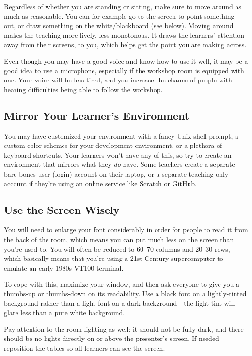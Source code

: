 Regardless of whether you are standing or sitting, make sure to move
around as much as reasonable. You can for example go to the screen to
point something out, or draw something on the white/blackboard (see
below). Moving around makes the teaching more lively, less monotonous.
It draws the learners' attention away from their screens, to you,
which helps get the point you are making across.

Even though you may have a good voice and know how to use it well, it
may be a good idea to use a microphone, especially if the workshop
room is equipped with one. Your voice will be less tired, and you
increase the chance of people with hearing difficulties being able to
follow the workshop.

\subsection*{Mirror Your Learner's Environment}

You may have customized your environment with a fancy Unix shell
prompt, a custom color schemes for your development environment, or a
plethora of keyboard shortcuts. Your learners won't have any of this,
so try to create an environment that mirrors what they \emph{do} have.
Some teachers create a separate bare-bones user (login) account on
their laptop, or a separate teaching-only account if they're using an
online service like Scratch or GitHub.

\subsection*{Use the Screen Wisely}

You will need to enlarge your font considerably in order for people to
read it from the back of the room, which means you can put much less
on the screen than you're used to.  You will often be reduced to
60--70 columns and 20--30 rows, which basically means that you're
using a 21st Century supercomputer to emulate an early-1980s VT100
terminal.

To cope with this, maximize your window, and then ask everyone to give
you a thumbs-up or thumbs-down on its readability. Use a black font on
a lightly-tinted background rather than a light font on a dark
background---the light tint will glare less than a pure white
background.

Pay attention to the room lighting as well: it should not be fully
dark, and there should be no lights directly on or above the
presenter's screen. If needed, reposition the tables so all learners
can see the screen.

